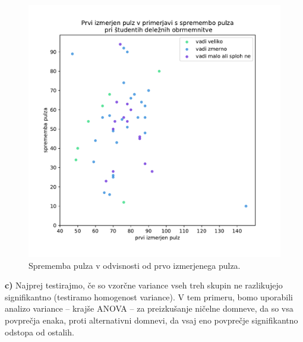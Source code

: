 \documentclass[a4paper,11pt]{article}
\begin{document}
\begin{figure}[h]
    \begin{center}
        \includegraphics[scale=0.65]{pulz_vadba.pdf}
        \caption{
            Sprememba pulza v odvisnosti od prvo izmerjenega pulza.
            }
        \label{Sprememba pulza v odvisnosti od prvo izmerjenega pulza}
    \end{center}
\end{figure}

\noindent
\textbf{c)} Najprej testirajmo, če so vzorčne variance vseh treh skupin ne razlikujejo signifikantno (testiramo homogenost variance). V tem primeru, bomo uporabili analizo variance -- krajše ANOVA -- za preizkušanje ničelne domneve, da so vsa povprečja enaka, proti alternativni domnevi, da vsaj eno povprečje signifikantno odstopa od ostalih.
\newline
\end{document}
